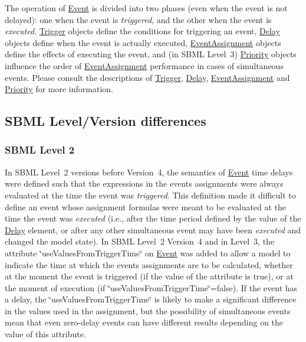 The operation of \hyperlink{class_event}{Event} is divided into two phases (even when the event is not delayed)\+: one when the event is {\itshape triggered}, and the other when the event is {\itshape executed}. \hyperlink{class_trigger}{Trigger} objects define the conditions for triggering an event, \hyperlink{class_delay}{Delay} objects define when the event is actually executed, \hyperlink{class_event_assignment}{Event\+Assignment} objects define the effects of executing the event, and (in S\+B\+ML Level~3) \hyperlink{class_priority}{Priority} objects influence the order of \hyperlink{class_event_assignment}{Event\+Assignment} performance in cases of simultaneous events. Please consult the descriptions of \hyperlink{class_trigger}{Trigger}, \hyperlink{class_delay}{Delay}, \hyperlink{class_event_assignment}{Event\+Assignment} and \hyperlink{class_priority}{Priority} for more information.\hypertarget{class_event_event-version-diffs}{}\subsection{S\+B\+M\+L Level/\+Version differences}\label{class_event_event-version-diffs}
\hypertarget{class_event_sbml-l2}{}\subsubsection{S\+B\+M\+L Level 2}\label{class_event_sbml-l2}
In S\+B\+ML Level~2 versions before Version~4, the semantics of \hyperlink{class_event}{Event} time delays were defined such that the expressions in the event\textquotesingle{}s assignments were always evaluated at the time the event was {\itshape triggered}. This definition made it difficult to define an event whose assignment formulas were meant to be evaluated at the time the event was {\itshape executed} (i.\+e., after the time period defined by the value of the \hyperlink{class_delay}{Delay} element, or after any other simultaneous event may have been {\itshape executed} and changed the model state). In S\+B\+ML Level~2 Version~4 and in Level~3, the attribute \char`\"{}use\+Values\+From\+Trigger\+Time\char`\"{} on \hyperlink{class_event}{Event} was added to allow a model to indicate the time at which the event\textquotesingle{}s assignments are to be calculated, whether at the moment the event is triggered (if the value of the attribute is {\ttfamily true}), or at the moment of execution (if \char`\"{}use\+Values\+From\+Trigger\+Time\char`\"{}={\ttfamily false}). If the event has a delay, the \char`\"{}use\+Values\+From\+Trigger\+Time\char`\"{} is likely to make a significant difference in the values used in the assignment, but the possibility of simultaneous events mean that even zero-\/delay events can have different results depending on the value of this attribute.

